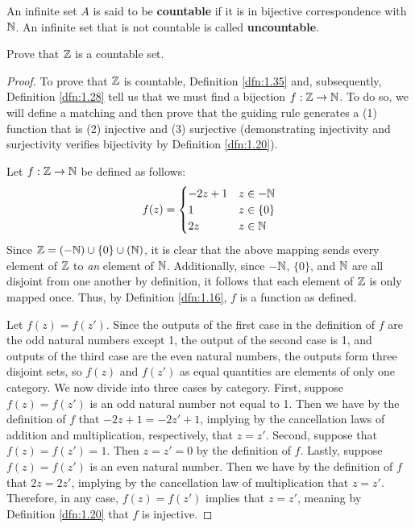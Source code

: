 \documentclass[../main.tex]{subfiles}
\begin{document}
\begin{definition}\label{dfn:1.35}
    An infinite set $A$ is said to be \textbf{countable} if it is in bijective correspondence with $\mathbb{N}$. An infinite set that is not countable is called \textbf{uncountable}.
\end{definition}

\begin{exercise}\label{exr:1.36}
    Prove that $\mathbb{Z}$ is a countable set.
    \begin{proof}
        To prove that $\mathbb{Z}$ is countable, Definition \ref{dfn:1.35} and, subsequently, Definition \ref{dfn:1.28} tell us that we must find a bijection $f:\mathbb{Z}\to\mathbb{N}$. To do so, we will define a matching and then prove that the guiding rule generates a (1) function that is (2) injective and (3) surjective (demonstrating injectivity and surjectivity verifies bijectivity by Definition \ref{dfn:1.20}).\par
        Let $f:\mathbb{Z}\to\mathbb{N}$ be defined as follows:
        \begin{equation*}
            f(z) =
            \begin{cases}
                -2z+1 & z\in-\mathbb{N}\\
                1 & z\in\{0\}\\
                2z & z\in\mathbb{N}
            \end{cases}
        \end{equation*}
        Since $\mathbb{Z}=(-\mathbb{N})\cup\{0\}\cup(\mathbb{N})$, it is clear that the above mapping sends every element of $\mathbb{Z}$ to \emph{an} element of $\mathbb{N}$. Additionally, since $-\mathbb{N}$, $\{0\}$, and $\mathbb{N}$ are all disjoint from one another by definition, it follows that each element of $\mathbb{Z}$ is only mapped once. Thus, by Definition \ref{dfn:1.16}, $f$ is a function as defined.\par
        Let $f(z)=f(z')$. Since the outputs of the first case in the definition of $f$ are the odd natural numbers except 1, the output of the second case is 1, and outputs of the third case are the even natural numbers, the outputs form three disjoint sets, so $f(z)$ and $f(z')$ as equal quantities are elements of only one category. We now divide into three cases by category. First, suppose $f(z)=f(z')$ is an odd natural number not equal to 1. Then we have by the definition of $f$ that $-2z+1=-2z'+1$, implying by the cancellation laws of addition and multiplication, respectively, that $z=z'$. Second, suppose that $f(z)=f(z')=1$. Then $z=z'=0$ by the definition of $f$. Lastly, suppose $f(z)=f(z')$ is an even natural number. Then we have by the definition of $f$ that $2z=2z'$, implying by the cancellation law of multiplication that $z=z'$. Therefore, in any case, $f(z)=f(z')$ implies that $z=z'$, meaning by Definition \ref{dfn:1.20} that $f$ is injective.\par

\end{proof}
\end{exercise}
\end{document}
